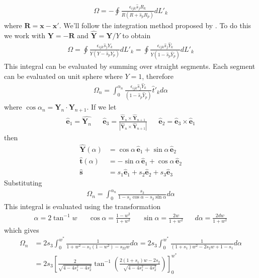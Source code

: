 \documentclass[10pt]{report}
\begin{document}
{\begin{align}
\Omega=-\oint\frac{\epsilon_{ijk}\hat{s}_jR_k}{R(R+\hat{s}_pR_p)}dL'_k
\end{align}
where $\bm R=\bm x-\bm x'$. We'll follow the integration method proposed by \cite{Asvestas:wt}. To do this we work with $\bm Y=-\bm R$ and $\hat{\bm Y}=\bm Y/Y$ to obtain  
\begin{align}
\Omega
=\oint\frac{\epsilon_{ijk}\hat{s}_jY_k}{Y(Y-\hat{s}_pY_p)}dL'_k
=\oint\frac{\epsilon_{ijk}\hat{s}_j\hat{Y}_k}{Y(1-\hat{s}_p\hat{Y}_p)}dL'_k
\end{align}
This integral can be evaluated by summing over straight segments. Each segment can be evaluated on unit sphere where $Y=1$, therefore
\begin{align}
\Omega_n=\int_0^{\alpha_n}\frac{\epsilon_{ijk}\hat{s}_j\hat{Y}_k}{(1-\hat{s}_p\hat{Y}_p)}\hat{t}'_kd\alpha
\end{align}
where $\cos\alpha_n=\bm Y_n\cdot \bm Y_{n+1}$.
If we let 
\begin{align}
\hat{\bm e}_1=\hat{\bm Y_n} && \hat{\bm e}_3=\frac{\hat{\bm Y}_n\times\hat{\bm Y}_{n+1}}{| \hat{\bm Y}_n\times\hat{\bm Y}_{n+1}|}  && \hat{\bm e}_2=\hat{\bm e}_3\times \hat{\bm e}_1
\end{align}
then
\begin{align}
\hat{\bm Y}(\alpha)&=\cos\alpha \, \hat{\bm e}_1+\sin \alpha \, \hat{\bm e}_2\\
\hat{\bm t}(\alpha)&=-\sin\alpha \, \hat{\bm e}_1+\cos \alpha \, \hat{\bm e}_2\\
\hat{\bm s}&=s_1 \hat{\bm e}_1+s_2 \hat{\bm e}_2+s_3 \hat{\bm e}_3
\end{align}
Substituting
\begin{align}
\Omega_n=\int_0^{\alpha_n}\frac{s_3}{1-s_1\cos\alpha-s_2\sin\alpha}d\alpha
\end{align}
This integral is evaluated using the transformation 
\begin{align}
\alpha =2\tan^{-1} w && \cos\alpha=\frac{1-w^2}{1+w^2} && \sin\alpha=\frac{2w}{1+w^2} && d\alpha=\frac{2dw}{1+w^2}
\end{align}
which gives
\begin{align}
\Omega_n
&=2s_3\int_0^{w^*}\frac{1}{1+w^2-s_1(1-w^2)-s_22w}d\alpha
=2s_3\int_0^{w^*}\frac{1}{(1+s_1)w^2-2s_2w+1-s_1}d\alpha\nonumber\\
&=2s_3\left[\frac{2}{\sqrt{4-4s_1^2-4s_2^2}}\tan^{-1}\left(\frac{2(1+s_1)w-2s_2}{\sqrt{4-4s_1^2-4s_2^2}}\right)\right]_0^{w^*}\nonumber\\

\end{align}}
\end{document}

